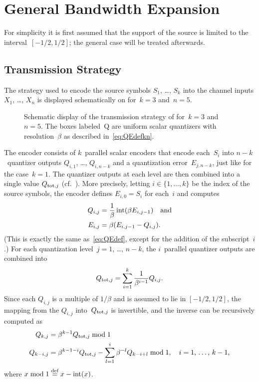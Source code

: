 \section{General Bandwidth Expansion}\label{sec:genbwexp}

For simplicity it is first assumed that the support of the source is limited to
the interval~$[-1/2, 1/2]$; the general case will be treated afterwards.

\subsection{Transmission Strategy}

The strategy used to encode the source symbols $S_1$, \dots, $S_k$ into the
channel inputs $X_1$, \dots, $X_n$ is displayed schematically on
 for~$k=3$ and~$n=5$. 
\begin{figure}[tbp]
  \begin{center}
    
  \end{center}
  \caption{Schematic display of the transmission strategy of 
  for~$k = 3$ and~$n=5$. The boxes labeled~\textsf{Q} are uniform scalar
  quantizers with resolution~$\beta$ as described in~\eqref{eq:QEdefkn}.}
  \label{fig:knencoding}
\end{figure}
The encoder consists of $k$~parallel scalar encoders that encode each~$S_i$ into
$n-k$~quantizer outputs $Q_{i,1}$, \dots, $Q_{i,n-k}$ and a quantization
error~$E_{j,n-k}$, just like for the case~$k=1$. The quantizer outputs at each
level are then combined into a single value $Q_{\operatorname{tot},j}$
(cf.~). More precisely, letting $i \in \{1, \dots, k\}$ be
the index of the source symbols, the encoder defines $E_{i,0} = S_i$ for
each~$i$ and computes
\begin{align}
  Q_{i,j} &= \frac{1}{\beta} \operatorname{int}(\beta E_{i,j-1}) \quad\text{and} \nonumber \\
  E_{i,j} &= \beta(E_{i,j-1} - Q_{i,j}). \label{eq:QEdefkn}
\end{align}
(This is exactly the same as~\eqref{eq:QEdef}, except for the addition of the
subscript~$i$.) For each quantization level~$j = 1$, \dots, $n-k$, the
$i$~parallel quantizer outputs are combined into
\begin{equation}
  \label{eq:Qtot}
  Q_{\operatorname{tot},j} = \sum_{i=1}^k \frac{1}{\beta^{i-1}} Q_{i,j}.
\end{equation}
Since each $Q_{i,j}$ is a multiple of $1/\beta$ and is assumed to lie in $[-1/2,
1/2]$, the mapping from the $Q_{i,j}$ into~$Q_{\operatorname{tot},j}$ is invertible, and the
inverse can be recursively computed as
\begin{align}
  Q_{k,j} &= \beta^{k-1} Q_{\operatorname{tot},j} \bmod 1 \nonumber \\
  Q_{k-i,j} &= \beta^{k-1-i} Q_{\operatorname{tot},j} - \sum_{l = 1}^i \beta^{-l} Q_{k - i +
  l} \bmod 1, \quad\text{$i = 1$, \dots, $k-1$,} 
  \label{eq:Qtotinv}
\end{align}
where $x \bmod 1 \stackrel{\text{def}}{=} x - \operatorname{int}(x)$.

